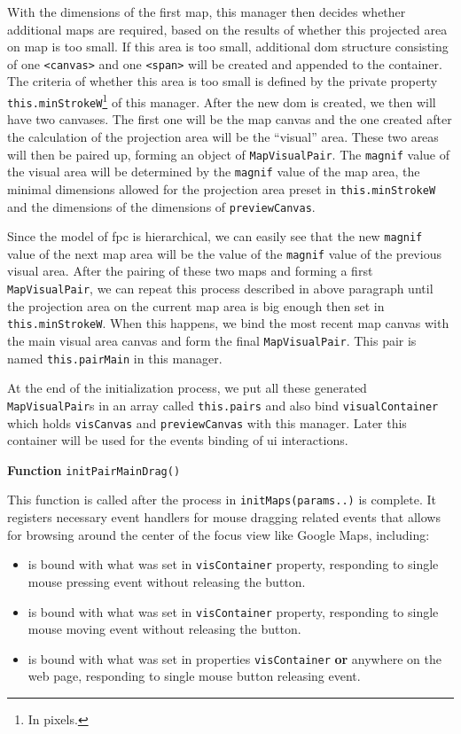 With the dimensions of the first \gls{map}, this manager then decides whether additional \glspl{map} are required, based on the results of whether this projected area on \gls{map} is too small. If this area is too small, additional \gls{dom} structure consisting of one \texttt{<canvas>} and one \texttt{<span>} will be created and appended to the container. The criteria of whether this area is too small is defined by the private property \texttt{this.minStrokeW}\footnote{ In pixels.} of this manager. After the new \gls{dom} is created, we then will have two canvases. The first one will be the \gls{map} canvas and the one created after the calculation of the projection area will be the ``visual'' area. These two areas will then be paired up, forming an object of \texttt{MapVisualPair}. The \texttt{magnif} value of the visual area will be determined by the \texttt{magnif} value of the \gls{map} area, the minimal dimensions allowed for the projection area preset in \texttt{this.minStrokeW} and the dimensions of the dimensions of \texttt{previewCanvas}.

Since the model of \gls{fpc} is hierarchical, we can easily see that the new \texttt{magnif} value of the next \gls{map} area will be the value of the \texttt{magnif} value of the previous visual area. After the pairing of these two \glspl{map} and forming a first \texttt{MapVisualPair}, we can repeat this process described in above paragraph until the projection area on the current \gls{map} area is big enough then set in \texttt{this.minStrokeW}. When this happens, we bind the most recent \gls{map} canvas with the main visual area canvas and form the final \texttt{MapVisualPair}. This pair is named \texttt{this.pairMain} in this manager.

At the end of the initialization process, we put all these generated \texttt{MapVisualPair}s in an array called \texttt{this.pairs} and also bind \texttt{visualContainer} which holds \texttt{visCanvas} and \texttt{previewCanvas} with this manager. Later this container will be used for the events binding of \gls{ui} interactions.

\textbf{Function} \verb|initPairMainDrag()|

This function is called after the process in \texttt{initMaps(params..)} is complete. It registers necessary event handlers for mouse dragging related events that allows for browsing around the center of the focus view like Google Maps, including:

\begin{itemize}
  \item {} is bound with what was set in \texttt{visContainer} property, responding to single mouse pressing event without releasing the button.
  \item {} is bound with what was set in \texttt{visContainer} property, responding to single mouse moving event without releasing the button.
  \item {} is bound with what was set in properties \texttt{visContainer} \textbf{or} anywhere on the web page, responding to single mouse button releasing event.
\end{itemize}

